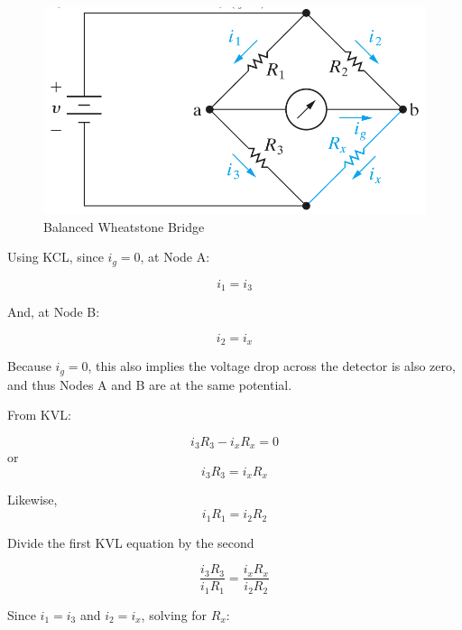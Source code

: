 \documentclass[14pt]{memoir}
\begin{document}
\begin{figure}[H]
\begin{center}
\includegraphics[scale=0.50]{fig/fig03_29.png}
\caption{Balanced Wheatstone Bridge}
\label{fig:fig03_29}
\end{center}
\end{figure}

Using KCL, since $i_g = 0$, at Node A:

\begin{equation}
i_1 = i_3
\end{equation}

And, at Node B:

\begin{equation}
i_2 = i_x
\end{equation}

Because $i_g = 0$, this also implies the voltage drop across the detector is also zero, and thus Nodes A and B are at the same potential. 

From KVL:

\begin{equation}
 i_3 R_3 - i_x R_x = 0
\end{equation}
or
\begin{equation}
i_3 R_3 = i_x R_x
\end{equation}

Likewise,
\begin{equation}
i_1 R_1 = i_2 R_2
\end{equation}

Divide the first KVL equation by the second

\begin{equation}
\frac{i_3 R_3}{i_1 R_1} = \frac{i_x R_x}{i_2 R_2}
\end{equation}

Since $i_1 = i_3$ and $i_2 = i_x$, solving for $R_x$:
\end{document}
